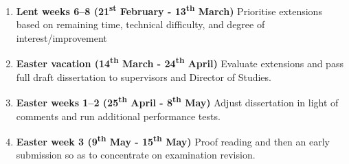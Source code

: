 \documentclass[12pt,a4paper,twoside]{article}
\begin{document}
\begin{enumerate}
\item \textbf{Lent weeks 6--8 (21\textsuperscript{st} February - 13\textsuperscript{th} March)}
  Prioritise extensions based on remaining time, technical difficulty, and degree of interest/improvement
\item \textbf{Easter vacation (14\textsuperscript{th} March - 24\textsuperscript{th} April)}
  Evaluate extensions and pass full draft dissertation to supervisors and Director of Studies.

\item \textbf{Easter weeks 1--2 (25\textsuperscript{th} April - 8\textsuperscript{th} May)}
  Adjust dissertation in light of comments and run additional performance tests.

\item \textbf{Easter week 3 (9\textsuperscript{th} May - 15\textsuperscript{th} May)}
  Proof reading and then an early submission so as to concentrate on examination revision.

\end{enumerate}
\end{document}
